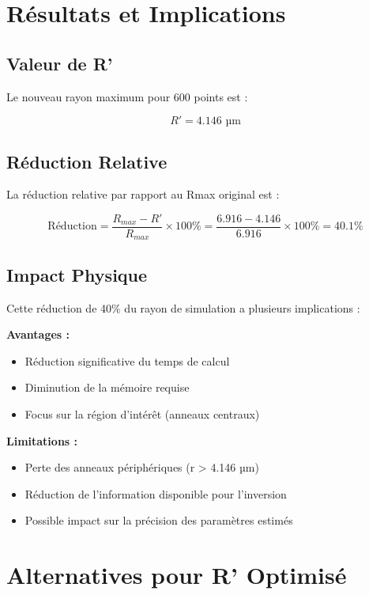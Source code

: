 \documentclass[twocolumn,10pt]{article}
\begin{document}
\section{Résultats et Implications}

\subsection{Valeur de R'}

Le nouveau rayon maximum pour 600 points est :

\begin{equation}
\boxed{R' = 4.146 \text{ µm}}
\end{equation}

\subsection{Réduction Relative}

La réduction relative par rapport au Rmax original est :

\begin{equation}
\text{Réduction} = \frac{R_{max} - R'}{R_{max}} \times 100\% = \frac{6.916 - 4.146}{6.916} \times 100\% = 40.1\%
\end{equation}

\subsection{Impact Physique}

Cette réduction de 40\% du rayon de simulation a plusieurs implications :

\textbf{Avantages :}
\begin{itemize}
\item Réduction significative du temps de calcul
\item Diminution de la mémoire requise
\item Focus sur la région d'intérêt (anneaux centraux)
\end{itemize}

\textbf{Limitations :}
\begin{itemize}
\item Perte des anneaux périphériques (r > 4.146 µm)
\item Réduction de l'information disponible pour l'inversion
\item Possible impact sur la précision des paramètres estimés
\end{itemize}

\section{Alternatives pour R' Optimisé}
\end{document}

